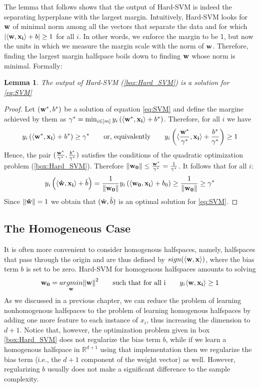 \documentclass[12pt]{report}
\theoremstyle{plain}
\newtheorem{lemma}{Lemma}[chapter]
\newcommand\sprod[2]{\langle \vb{#1},\vb{#2}\rangle}
\begin{document}
\begin{flushleft}
\begin{tcolorbox}
	\label{box:Hard_SVM}
\end{tcolorbox}
The lemma that follows shows that the output of Hard-SVM is indeed the separating hyperplane with the largest margin. Intuitively, Hard-SVM looks for $\vb{w}$ of minimal norm among all the vectors that separate the data and for which $\abs{\sprod{w}{x_i}+b}\geq 1$ for all $i$. In other words, we enforce the margin to be 1, but now the units in which we measure the margin scale with the norm of $\vb{w}$. Therefore, finding the largest margin halfspace boils down to finding $\vb{w}$ whose norm is minimal. Formally:
\begin{lemma}
	The output of Hard-SVM (\ref{box:Hard_SVM}) is a solution for \ref{eq:SVM}\\
\end{lemma}
\begin{proof}
	Let $(\vb{w}^*,b^*)$ be a solution of equation \ref{eq:SVM} and define the margine achieved by them as $\gamma^*=\min_{i\in[m]}y_i\left(\sprod{w^*}{x_i}+b^*\right)$. Therefore, for all $i$ we have
	\[ y_i\left(\sprod{w^*}{x_i}+b^*\right)\geq\gamma^* \qquad\text{or, equivalently}\qquad y_i\left(\sprod{\frac{w^*}{\gamma^*}}{x_i}+\frac{b^*}{\gamma^*}\right)\geq 1 \]
	Hence, the pair $(\frac{\vb{w}^*}{\gamma^*},\frac{b^*}{\gamma^*})$ satisfies the conditions of the quadratic optimization problem (\ref{box:Hard_SVM}). Therefore $\norm{\vb{w_0}}\leq\frac{\vb{w}^*}{\gamma^*}=\frac{1}{\gamma^*}$. It follows that for all $i$:
	\[ y_i\left(\sprod{\hat{w}}{x_i}+\hat{b}\right)=\frac{1}{\norm{\vb{w_0}}}y_i\left(\sprod{w_0}{x_i}+b_0\right)\geq\frac{1}{\norm{\vb{w_0}}}\geq\gamma^* \]
	Since $\norm{\vb{\hat{w}}}=1$ we obtain that $(\hat{\vb{w}},\hat{b})$ is an optimal solution for \ref{eq:SVM}.
\end{proof}

\subsection{The Homogeneous Case}
It is often more convenient to consider homogenous halfspaces, namely, halfspaces that pass through the origin and are thus defined by $sign(\sprod{w}{x})$, where the bias term $b$ is set to be zero. Hard-SVM for homogenous halfspaces amounts to solving
\begin{equation}
\vb{w_0}=\underset{\vb{w}}{argmin}\norm{\vb{w}}^2 \qquad\text{such that for all i}\qquad y_i\sprod{w}{x_i}\geq 1
\label{eq:SVM_hom}
\end{equation}
As we discussed in a previous chapter, we can reduce the problem of learning nonhomogenous halfspaces to the problem of learning homogenous halfspaces by adding one more feature to each instance of $x_i$, thus increasing the dimension to $d+1$. Notice that, however, the optimization problem given in box \ref{box:Hard_SVM} does not regularize the bias term $b$, while if we learn a homogenous halfspace in $\mathds{R}^{d+1}$ using that implementation then we regularize the bias term (i.e., the $d+1$ component of the weight vector) as well. However, regularizing $b$ usually does not make a significant difference to the sample complexity.


\end{flushleft}
\end{document}

